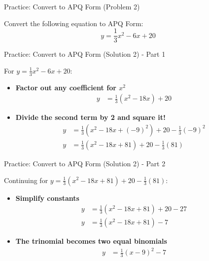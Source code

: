 \documentclass[aspectratio=169]{beamer}
\begin{document}
\begin{frame}{Practice: Convert to APQ Form (Problem 2)}
    \begin{tcolorbox}[colback=lightgray,colframe=primary,title=Problem 2]
        \footnotesize
        Convert the following equation to APQ Form:
        \[ y = \frac{1}{3}x^2 - 6x + 20 \]
    \end{tcolorbox}
\end{frame}

\begin{frame}{Practice: Convert to APQ Form (Solution 2) - Part 1}
    \begin{tcolorbox}[colback=lightgray,colframe=accent,title=Solution 2 - Part 1]
        \footnotesize
        For $y = \frac{1}{3}x^2 - 6x + 20$:
        \begin{itemize}
            \item \textbf{Factor out any coefficient for $x^2$}
                \begin{align*}
                    y &= \frac{1}{3}(x^2 - 18x) + 20
                \end{align*}
            \item \textbf{Divide the second term by 2 and square it!}
                \begin{align*}
                    y &= \frac{1}{3}(x^2 - 18x + (-9)^2) + 20 - \frac{1}{3}(-9)^2 \\
                    y &= \frac{1}{3}(x^2 - 18x + 81) + 20 - \frac{1}{3}(81)
                \end{align*}
        \end{itemize}
    \end{tcolorbox}
\end{frame}

\begin{frame}{Practice: Convert to APQ Form (Solution 2) - Part 2}
    \begin{tcolorbox}[colback=lightgray,colframe=accent,title=Solution 2 - Part 2 (Cont.)]
        \footnotesize
        Continuing for $y = \frac{1}{3}(x^2 - 18x + 81) + 20 - \frac{1}{3}(81)$:
        \begin{itemize}
            \item \textbf{Simplify constants}
                \begin{align*}
                    y &= \frac{1}{3}(x^2 - 18x + 81) + 20 - 27 \\
                    y &= \frac{1}{3}(x^2 - 18x + 81) - 7
                \end{align*}
            \item \textbf{The trinomial becomes two equal binomials}
                \begin{align*}
                    y &= \frac{1}{3}(x-9)^2 - 7
                \end{align*}
        \end{itemize}
    \end{tcolorbox}
\end{frame}
\end{document}

